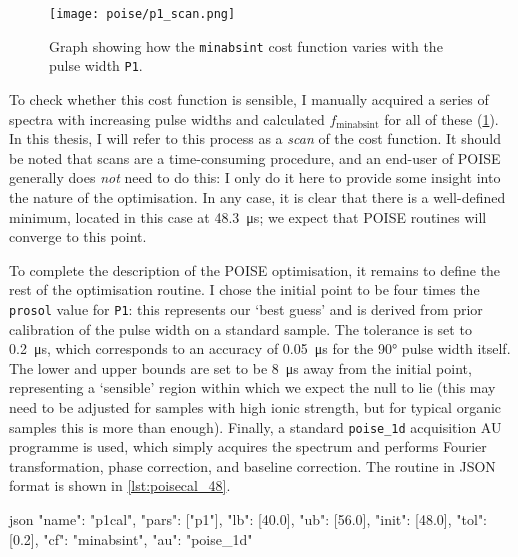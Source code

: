 \begin{figure}[htb]
    \centering
    \texttt{[image: poise/p1\_scan.png]}
    \caption[Cost function scan for pulse width optimisation]{Graph showing how the \texttt{minabsint} cost function varies with the pulse width \texttt{P1}.}
    \label{fig:p1_scan}
\end{figure}

To check whether this cost function is sensible, I manually acquired a series of spectra with increasing pulse widths and calculated $f_\text{minabsint}$ for all of these (\cref{fig:p1_scan}).
In this thesis, I will refer to this process as a \textit{scan} of the cost function.
It should be noted that scans are a time-consuming procedure, and an end-user of POISE generally does \textit{not} need to do this: I only do it here to provide some insight into the nature of the optimisation.
In any case, it is clear that there is a well-defined minimum, located in this case at \SI{48.3}{\us}; we expect that POISE routines will converge to this point.

To complete the description of the POISE optimisation, it remains to define the rest of the optimisation routine.
I chose the initial point to be four times the \texttt{prosol} value for \texttt{P1}: this represents our `best guess' and is derived from prior calibration of the pulse width on a standard sample.
The tolerance is set to \SI{0.2}{\us}, which corresponds to an accuracy of \SI{0.05}{\us} for the \ang{90} pulse width itself.
The lower and upper bounds are set to be \SI{8}{\us} away from the initial point, representing a `sensible' region within which we expect the null to lie (this may need to be adjusted for samples with high ionic strength, but for typical organic samples this is more than enough).
Finally, a standard \texttt{poise\_1d} acquisition AU programme is used, which simply acquires the spectrum and performs Fourier transformation, phase correction, and baseline correction.
The routine in JSON format is shown in \cref{lst:poisecal_48}.

\begin{mylisting}[htb]
\begin{tcbminted}{json}
{ "name": "p1cal",
  "pars": ["p1"],
  "lb": [40.0],
  "ub": [56.0],
  "init": [48.0],
  "tol": [0.2],
  "cf": "minabsint",
  "au": "poise_1d" }
\end{tcbminted}
    \caption[POISE routine for pulse width calibration.]{POISE routine used for pulse width calibrations shown in \cref{tbl:poisecal_48}.}
    \label{lst:poisecal_48}
\end{mylisting}

